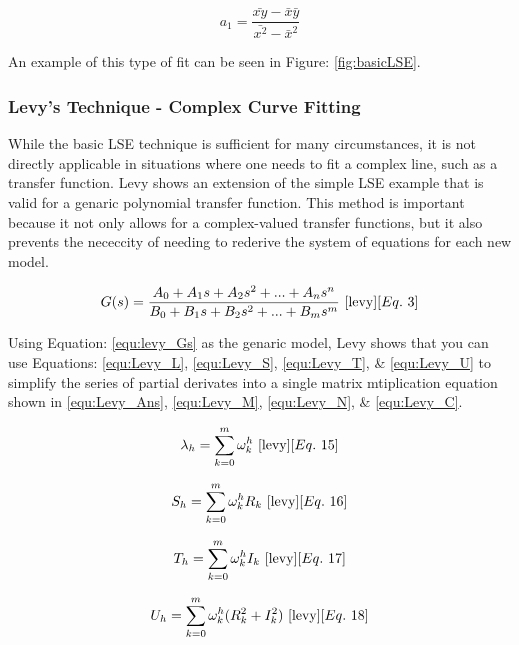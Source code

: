 \begin{equation}
    \label{equ:LSE_sold}
    a_1 = \frac{\bar{xy} - \bar{x}\bar{y}}{\bar{x^2} - \bar{x}^2}
\end{equation}

An example of this type of fit can be seen in Figure: \ref{fig:basicLSE}.


\subsubsection{Levy's Technique - Complex Curve Fitting}
While the basic LSE technique is sufficient for many circumstances, it is not directly applicable in situations where one needs to fit a complex line, such as a transfer function. Levy \cite{levy} shows an extension of the simple LSE example that is valid for a genaric polynomial transfer function. This method is important because it not only allows for a complex-valued transfer functions, but it also prevents the nececcity of needing to rederive the system of equations for each new model. 

\begin{equation}
    \label{equ:levy_Gs}
    G(s) = \frac{A_0 + A_1 s + A_2 s^2 + ... + A_n s^n}{B_0 + B_1 s + B_2 s^2 + ... + B_m s^m}
    ~\cite{levy}[Eq.~3]
\end{equation}

Using Equation: \eqref{equ:levy_Gs} as the genaric model, Levy shows that you can use Equations: \eqref{equ:Levy_L}, \eqref{equ:Levy_S}, \eqref{equ:Levy_T}, \& \eqref{equ:Levy_U} to simplify the series of partial derivates into a single matrix mtiplication equation shown in \eqref{equ:Levy_Ans}, \eqref{equ:Levy_M}, \eqref{equ:Levy_N}, \& \eqref{equ:Levy_C}.

\begin{equation}
    \label{equ:Levy_L}
    \lambda _h = \sum_{k=0}^{m} \omega _k ^h
    ~\cite{levy}[Eq.~15]
\end{equation}

\begin{equation}
    \label{equ:Levy_S}
    S_h = \sum_{k=0}^{m} \omega _k ^h R_k
    ~\cite{levy}[Eq.~16]
\end{equation}

\begin{equation}
    \label{equ:Levy_T}
    T_h = \sum_{k=0}^{m} \omega _k ^h I_k
    ~\cite{levy}[Eq.~17]
\end{equation}

\begin{equation}
    \label{equ:Levy_U}
    U_h = \sum_{k=0}^{m} \omega _k ^h (R_k ^2 + I_k ^2)
    ~\cite{levy}[Eq.~18]
\end{equation}

